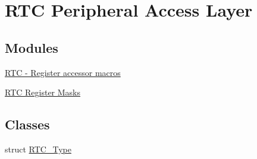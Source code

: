 \hypertarget{group__RTC__Peripheral__Access__Layer}{}\section{R\+TC Peripheral Access Layer}
\label{group__RTC__Peripheral__Access__Layer}
\subsection*{Modules}
\begin{DoxyCompactItemize}
\item 
\hyperlink{group__RTC__Register__Accessor__Macros}{R\+T\+C -\/ Register accessor macros}
\item 
\hyperlink{group__RTC__Register__Masks}{R\+T\+C Register Masks}
\end{DoxyCompactItemize}
\subsection*{Classes}
\begin{DoxyCompactItemize}
\item 
struct \hyperlink{structRTC__Type}{R\+T\+C\+\_\+\+Type}
\end{DoxyCompactItemize}
